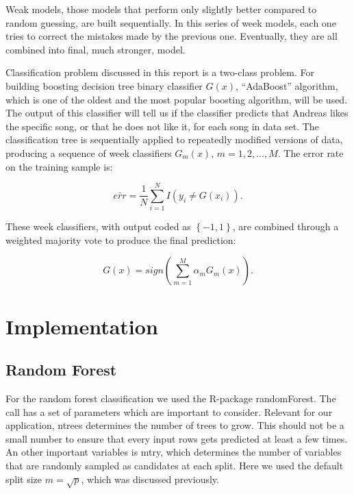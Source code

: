 \documentclass{article}
\begin{document}
Weak models, those models that perform only slightly better compared to random guessing, are built sequentially. In this series of week models, each one tries to correct the mistakes made by the previous one. Eventually, they are all combined into final, much stronger, model. 

Classification problem discussed in this report is a two-class problem. For building boosting decision tree binary classifier $G(x)$, ``AdaBoost'' algorithm, which is one of the oldest and the most popular boosting algorithm, will be used. The output of this classifier will tell us if the classifier predicts that Andreas likes the specific song, or that he does not like it, for each song in data set. The classification tree is sequentially applied to repeatedly modified versions of data, producing a sequence of week classifiers $G_m(x)$, $m=1,2,...,M$. The error rate on the training sample is:

\begin{equation} \label{boost_error_rate}
\bar{err}=\frac{1}{N}\sum_{i=1}^{N}I(y_i\neq G(x_i)).
\end{equation}

These week classifiers, with output coded as $\left\{-1,1\right\}$, are combined through a weighted
majority vote to produce the final prediction:

\begin{equation} \label{boost_final_pred}
G(x)=sign(\sum_{m=1}^{M}\alpha_m G_m(x)).
\end{equation}

\section{Implementation}

\subsection{Random Forest}

For the random forest classification we used the R-package {\selectfont randomForest}. The call has a set of parameters which are important to consider. Relevant for our application, {\selectfont ntrees} determines the number of trees to grow. This should not be a small number to ensure that every input rows gets predicted at least a few times.
An other important variables is {\selectfont mtry}, which determines the number of variables that are randomly sampled as candidates at each split. Here we used the default split size $m=\sqrt{p}$, which was discussed previously.
\end{document}
